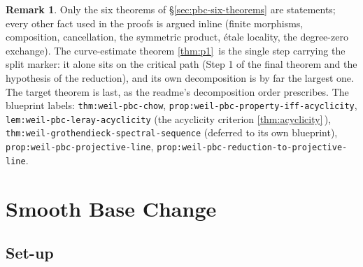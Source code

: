 \documentclass[11pt]{article}
\theoremstyle{plain}
\theoremstyle{definition}
\newtheorem{remark}[theorem]{Remark}
\newcommand{\uses}[1]{\par\smallskip\noindent{\footnotesize\textit{Uses:}\ #1\par}\smallskip}
\newcommand{\Cref}[1]{\hyperref[#1]{\ref{#1}}\,\hyperref[#1]{\nameref*{#1}}}
\begin{document}
\begin{remark}
	Only the six theorems of \S\ref{sec:pbc-six-theorems} are statements; every other fact used
	in the proofs is argued inline (finite morphisms, composition,
	cancellation, the symmetric product, \'etale locality, the
	degree-zero exchange).  The curve-estimate theorem \Cref{thm:p1} is
	the single step carrying the split marker: it alone sits on the
	critical path (Step 1 of the final theorem and the hypothesis of the
	reduction), and its own decomposition is by far the largest one.
	The target theorem is last, as the readme's decomposition order
	prescribes.  The blueprint labels:
	\nolinkurl{thm:weil-pbc-chow},
	\nolinkurl{prop:weil-pbc-property-iff-acyclicity},
	\nolinkurl{lem:weil-pbc-leray-acyclicity} (the acyclicity criterion
	\Cref{thm:acyclicity}),
	\nolinkurl{thm:weil-grothendieck-spectral-sequence} (deferred to its
	own blueprint),
	\nolinkurl{prop:weil-pbc-projective-line},
	\nolinkurl{prop:weil-pbc-reduction-to-projective-line}.
\end{remark}

\clearpage
\begingroup
\setlength{\emergencystretch}{2em}
\let\smoothuses\uses
\renewcommand{\uses}[1]{{\raggedright\smoothuses{#1}}}
\section{Smooth Base Change}
\label{sec:smooth-base-change}
\begin{abstract}
content: proof of smooth base change theorem
\\key theorem: Thm \ref{thm:smooth-base-change}{stacks project tag: 0EYU}
\\references: stacks project
\end{abstract}

\subsection{Set-up}
\end{document}
